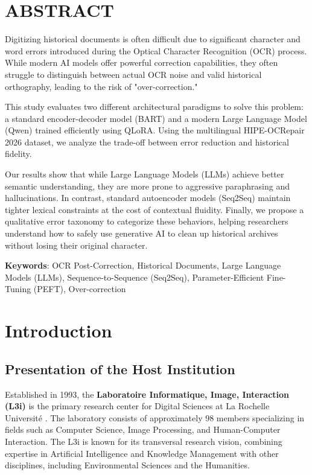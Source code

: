 \documentclass[11pt]{extarticle}
\begin{document}
\section*{ABSTRACT}

Digitizing historical documents is often difficult due to significant character and word errors introduced during the Optical Character Recognition (OCR) process. While modern AI models offer powerful correction capabilities, they often struggle to distinguish between actual OCR noise and valid historical orthography, leading to the risk of "over-correction."

This study evaluates two different architectural paradigms to solve this problem: a standard encoder-decoder model (BART) and a modern Large Language Model (Qwen) trained efficiently using QLoRA. Using the multilingual HIPE-OCRepair 2026 dataset, we analyze the trade-off between error reduction and historical fidelity.

Our results show that while Large Language Models (LLMs) achieve better semantic understanding, they are more prone to aggressive paraphrasing and hallucinations. In contrast, standard autoencoder models (Seq2Seq) maintain tighter lexical constraints at the cost of contextual fluidity. Finally, we propose a qualitative error taxonomy to categorize these behaviors, helping researchers understand how to safely use generative AI to clean up historical archives without losing their original character.

\textbf{Keywords}: OCR Post-Correction, Historical Documents, Large Language Models (LLMs), Sequence-to-Sequence (Seq2Seq), Parameter-Efficient Fine-Tuning (PEFT), Over-correction

\newpage




\section{Introduction}
\subsection{Presentation of the Host Institution}
Established in 1993, the \textbf{Laboratoire Informatique, Image, Interaction (L3i)} is the primary research center for Digital Sciences at La Rochelle Université \cite{l3i_website}. The laboratory consists of approximately 98 members specializing in fields such as Computer Science, Image Processing, and Human-Computer Interaction. The L3i is known for its transversal research vision, combining expertise in Artificial Intelligence and Knowledge Management with other disciplines, including Environmental Sciences and the Humanities.
\end{document}
